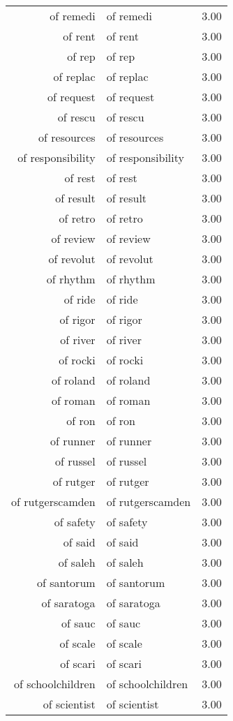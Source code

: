 \begin{table}[ht]
\begin{tabular}{rlr}
  of remedi & of remedi & 3.00 \\ 
  of rent & of rent & 3.00 \\ 
  of rep & of rep & 3.00 \\ 
  of replac & of replac & 3.00 \\ 
  of request & of request & 3.00 \\ 
  of rescu & of rescu & 3.00 \\ 
  of resources & of resources & 3.00 \\ 
  of responsibility & of responsibility & 3.00 \\ 
  of rest & of rest & 3.00 \\ 
  of result & of result & 3.00 \\ 
  of retro & of retro & 3.00 \\ 
  of review & of review & 3.00 \\ 
  of revolut & of revolut & 3.00 \\ 
  of rhythm & of rhythm & 3.00 \\ 
  of ride & of ride & 3.00 \\ 
  of rigor & of rigor & 3.00 \\ 
  of river & of river & 3.00 \\ 
  of rocki & of rocki & 3.00 \\ 
  of roland & of roland & 3.00 \\ 
  of roman & of roman & 3.00 \\ 
  of ron & of ron & 3.00 \\ 
  of runner & of runner & 3.00 \\ 
  of russel & of russel & 3.00 \\ 
  of rutger & of rutger & 3.00 \\ 
  of rutgerscamden & of rutgerscamden & 3.00 \\ 
  of safety & of safety & 3.00 \\ 
  of said & of said & 3.00 \\ 
  of saleh & of saleh & 3.00 \\ 
  of santorum & of santorum & 3.00 \\ 
  of saratoga & of saratoga & 3.00 \\ 
  of sauc & of sauc & 3.00 \\ 
  of scale & of scale & 3.00 \\ 
  of scari & of scari & 3.00 \\ 
  of schoolchildren & of schoolchildren & 3.00 \\ 
  of scientist & of scientist & 3.00 \\ 

\end{tabular}
\end{table}
